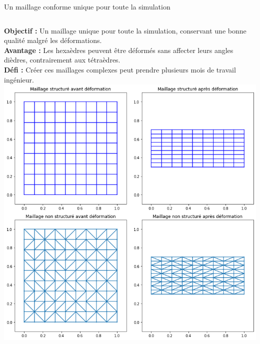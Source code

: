 \documentclass{beamer}
\begin{document}
\begin{frame}{Un maillage conforme unique pour toute la simulation}
    \begin{columns}
    \small{
        \textbf{Objectif :} Un maillage unique pour toute la simulation, conservant une bonne qualité malgré les déformations.\\
    }
    \vspace{0.3cm}
    \small{
        \textbf{Avantage :} Les hexaèdres peuvent être déformés sans affecter leurs angles dièdres, contrairement aux tétraèdres.\\
    }
    \vspace{0.3cm}
    \small{
        \textbf{Défi :} Créer ces maillages complexes peut prendre plusieurs mois de travail ingénieur.\\
    }
        \includegraphics[width=\textwidth]{img/choix_maillage/deformation_low_angle.png}
    \end{columns}
    \end{frame}
\end{document}
